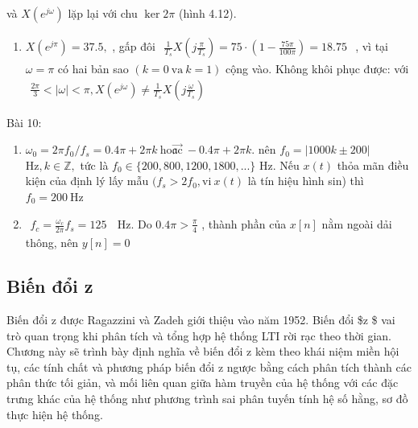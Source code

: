 \documentclass[
  10
]{article}
\providecommand{\tightlist}{%
  \setlength{\itemsep}{0pt}\setlength{\parskip}{0pt}}
\begin{document}
và \(X ( e ^ { j \omega } )\) lặp lại với chu \(\ker 2 \pi\) (hình
4.12).

\begin{enumerate}
\def\labelenumi{\alph{enumi}.}
\setcounter{enumi}{2}
\tightlist
\item
  \(X ( e ^ { j \pi } ) = 3 7 . 5 ,\) , gấp đôi
  \(\begin{array} { r } { \frac { 1 } { T _ { s } } X \left( j \frac { \pi } { T _ { s } } \right) = 7 5 \cdot \left( 1 - \frac { 7 5 \pi } { 1 0 0 \pi } \right) = 1 8 . 7 5 } \end{array}\)
  , vì tại \(\omega = \pi\) có hai bản sao
  \(( k = 0 \mathrm { \ v a \ } k = 1 )\) cộng vào. Không khôi phục
  được: với
  \(\begin{array} { r } { \frac { 2 \pi } { 3 } < | \omega | < \pi , X ( e ^ { j \omega } ) \neq \frac { 1 } { T _ { s } } X \left( j \frac { \omega } { T _ { s } } \right) } \end{array}\)
\end{enumerate}

Bài 10:

\begin{enumerate}
\def\labelenumi{\alph{enumi}.}
\item
  \(\omega _ { 0 } = 2 \pi f _ { 0 } / f _ { s } = 0 . 4 \pi + 2 \pi k \mathrm { ~ h o \vec { \mathfrak { a } c } ~ } - 0 . 4 \pi + 2 \pi k .\)
  nên \(f _ { 0 } = | 1 0 0 0 k \pm 2 0 0 |\)
  \(\mathrm { H z } , k \in \mathbb { Z } ,\) tức là
  \(f _ { 0 } \in \{ 2 0 0 , 8 0 0 , 1 2 0 0 , 1 8 0 0 , . . . \}\) Hz.
  Nếu \(x ( t )\) thỏa mãn điều kiện của định lý lấy mẫu
  \(( f _ { s } > 2 f _ { 0 } , \mathrm { v i } \ x ( t )\) là tín hiệu
  hình sin) thì \(f _ { 0 } = 2 0 0 \ \mathrm { H z }\)
\item
  \(\begin{array} { r } { f _ { c } = \frac { \omega _ { c } } { 2 \pi } f _ { s } = 1 2 5 \ } \end{array}\)
  Hz. Do \(\textstyle 0 . 4 \pi > { \frac { \pi } { 4 } }\) , thành phần
  của \(x [ n ]\) nằm ngoài dải thông, nên \(y [ n ] = 0\)
\end{enumerate}

\subsection{Biến đổi z}\label{biux1ebfn-ux111ux1ed5i-z}

Biến đổi z được Ragazzini và Zadeh giới thiệu vào năm 1952. Biến đổi \$z
\cot \$ vai trò quan trọng khi phân tích và tổng hợp hệ thống LTI rời
rạc theo thời gian. Chương này sẽ trình bày định nghĩa về biến đổi z kèm
theo khái niệm miền hội tụ, các tính chất và phương pháp biến đổi z
ngược bằng cách phân tích thành các phân thức tối giản, và mối liên quan
giữa hàm truyền của hệ thống với các đặc trưng khác của hệ thống như
phương trình sai phân tuyến tính hệ số hằng, sơ đồ thực hiện hệ thống.
\end{document}
